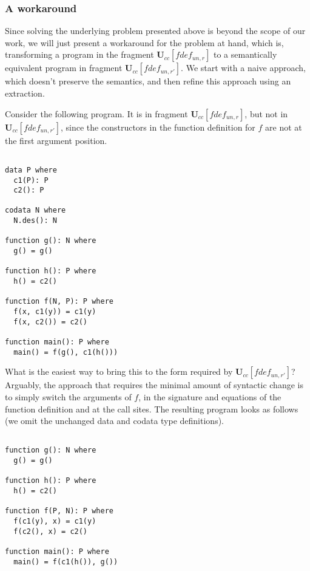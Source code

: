 \subsubsection{A workaround}

Since solving the underlying problem presented above is beyond the scope of our work, we will just present a workaround for the problem at hand, which is, transforming a program in the fragment $\mathbf{U}_{cc}[fdef_{un,r}]$ to a semantically equivalent program in fragment $\mathbf{U}_{cc}[fdef_{un,r'}]$. We start with a naive approach, which doesn't preserve the semantics, and then refine this approach using an extraction.

Consider the following program. It is in fragment $\mathbf{U}_{cc}[fdef_{un,r}]$, but not in $\mathbf{U}_{cc}[fdef_{un,r'}]$, since the constructors in the function definition for $f$ are not at the first argument position.

\begin{lstlisting}

data P where
  c1(P): P
  c2(): P

codata N where
  N.des(): N

function g(): N where
  g() = g()

function h(): P where
  h() = c2()

function f(N, P): P where
  f(x, c1(y)) = c1(y)
  f(x, c2()) = c2()

function main(): P where
  main() = f(g(), c1(h()))

\end{lstlisting}

What is the easiest way to bring this to the form required by $\mathbf{U}_{cc}[fdef_{un,r'}]$? Arguably, the approach that requires the minimal amount of syntactic change is to simply switch the arguments of $f$, in the signature and equations of the function definition and at the call sites. The resulting program looks as follows (we omit the unchanged data and codata type definitions).

\begin{lstlisting}

function g(): N where
  g() = g()

function h(): P where
  h() = c2()

function f(P, N): P where
  f(c1(y), x) = c1(y)
  f(c2(), x) = c2()

function main(): P where
  main() = f(c1(h()), g())

\end{lstlisting}

